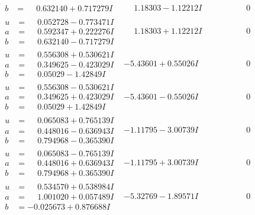 \documentclass[1p]{elsarticle_modified}
\theoremstyle{definition}
\begin{document}
$$\begin{array}{c|c|c}
\begin{aligned}
b &= \phantom{-}0.632140 + 0.717279 I\end{aligned}
 & \phantom{-}1.18303 - 1.12212 I & \phantom{-0.000000 } 0 \\ \hline\begin{aligned}
u &= \phantom{-}0.052728 - 0.773471 I \\
a &= \phantom{-}0.592347 + 0.222276 I \\
b &= \phantom{-}0.632140 - 0.717279 I\end{aligned}
 & \phantom{-}1.18303 + 1.12212 I & \phantom{-0.000000 } 0 \\ \hline\begin{aligned}
u &= \phantom{-}0.556308 + 0.530621 I \\
a &= \phantom{-}0.349625 - 0.423029 I \\
b &= \phantom{-}0.05029 - 1.42849 I\end{aligned}
 & -5.43601 + 0.55026 I & \phantom{-0.000000 } 0 \\ \hline\begin{aligned}
u &= \phantom{-}0.556308 - 0.530621 I \\
a &= \phantom{-}0.349625 + 0.423029 I \\
b &= \phantom{-}0.05029 + 1.42849 I\end{aligned}
 & -5.43601 - 0.55026 I & \phantom{-0.000000 } 0 \\ \hline\begin{aligned}
u &= \phantom{-}0.065083 + 0.765139 I \\
a &= \phantom{-}0.448016 - 0.636943 I \\
b &= \phantom{-}0.794968 - 0.365390 I\end{aligned}
 & -1.11795 - 3.00739 I & \phantom{-0.000000 } 0 \\ \hline\begin{aligned}
u &= \phantom{-}0.065083 - 0.765139 I \\
a &= \phantom{-}0.448016 + 0.636943 I \\
b &= \phantom{-}0.794968 + 0.365390 I\end{aligned}
 & -1.11795 + 3.00739 I & \phantom{-0.000000 } 0 \\ \hline\begin{aligned}
u &= \phantom{-}0.534570 + 0.538984 I \\
a &= \phantom{-}1.001020 + 0.057489 I \\
b &= -0.025673 + 0.876688 I\end{aligned}
 & -5.32769 - 1.89571 I & \phantom{-0.000000 } 0 \\ \hline\begin{aligned}

\end{aligned}
\end{array}$$
\end{document}
